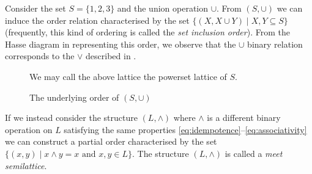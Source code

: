 \begin{example}
\label{example:power-set-lattice}
     Consider the set $S = \{1,2,3\}$ and the union operation $\cup$. From $(S, \cup)$ we can induce the order relation characterised by the set $\{(X, X \cup Y) \mid X,Y \subseteq S \}$ (frequently, this kind of ordering is called the \textit{set inclusion order}). From the Hasse diagram in  representing this order, we observe that the $\cup$ binary relation corresponds to the $\vee$ described in .
%
\begin{figure}[H]
  \centering
  \caption{The underlying order of $(S, \cup)$}
  \label{figure:set-inclusion-order}

  We may call the above lattice the powerset lattice of $S$.
\end{figure}
\end{example}

If we instead consider the structure $(L, \wedge)$ where $\wedge$ is a different binary operation on $L$ satisfying the same properties \cref{eq:idempotence}--\cref{eq:associativity} we can construct a partial order characterised by the set $\{(x,y) \mid x \wedge y = x \text{ and } x,y \in L\}$. The structure $(L, \wedge)$ is called a \textit{meet semilattice}.

